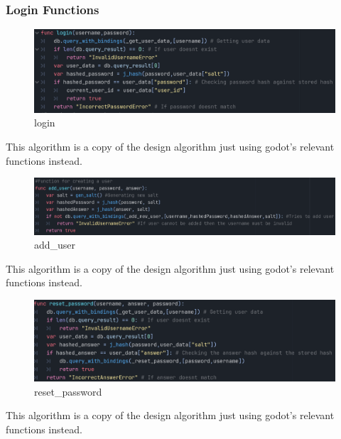 \documentclass{article}
\begin{document}
        \subsubsection{Login Functions}
        \begin{figure}[H]
                \centering
                \includegraphics[width = \columnwidth]{images/development/login.PNG}
                \caption{login}
        \end{figure}
        This algorithm is a copy of the design algorithm just using godot's relevant functions instead.\\
        \begin{figure}[H]
                \centering
                \includegraphics[width = \columnwidth]{images/development/add_user.PNG}
                \caption{add\_user}
        \end{figure}
        This algorithm is a copy of the design algorithm just using godot's relevant functions instead.\\
        \begin{figure}[H]
                \centering
                \includegraphics[width = \columnwidth]{images/development/reset_password.PNG}
                \caption{reset\_password}
        \end{figure}
        This algorithm is a copy of the design algorithm just using godot's relevant functions instead.\\
\end{document}
